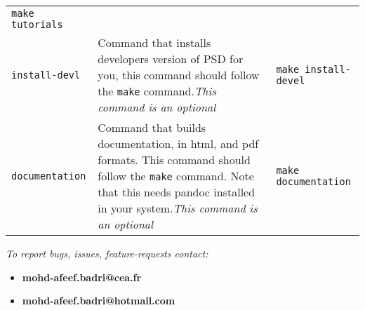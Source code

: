 \begin{longtable}[]{@{}lll@{}}
\begin{minipage}[t]{0.30\columnwidth}
\lstinline!make tutorials!\strut
\end{minipage}\tabularnewline
\begin{minipage}[t]{0.15\columnwidth}\raggedright\strut
\lstinline!install-devl!\strut
\end{minipage} & \begin{minipage}[t]{0.47\columnwidth}\raggedright\strut
Command that installs developers version of PSD for you, this command
should follow the \lstinline!make! command.\emph{This command is an
optional}\strut
\end{minipage} & \begin{minipage}[t]{0.30\columnwidth}\raggedright\strut
\lstinline!make install-devel!\strut
\end{minipage}\tabularnewline
\begin{minipage}[t]{0.15\columnwidth}\raggedright\strut
\lstinline!documentation!\strut
\end{minipage} & \begin{minipage}[t]{0.47\columnwidth}\raggedright\strut
Command that builds documentation, in html, and pdf formats. This
command should follow the \lstinline!make! command. Note that this needs
pandoc installed in your system.\emph{This command is an optional}\strut
\end{minipage} & \begin{minipage}[t]{0.30\columnwidth}\raggedright\strut
\lstinline!make documentation!\strut
\end{minipage}\tabularnewline
\bottomrule
\end{longtable}

\emph{To report bugs, issues, feature-requests contact:}

\begin{itemize}
\tightlist
\item
  \textbf{mohd-afeef.badri@cea.fr}
\item
  \textbf{mohd-afeef.badri@hotmail.com}
\end{itemize}
